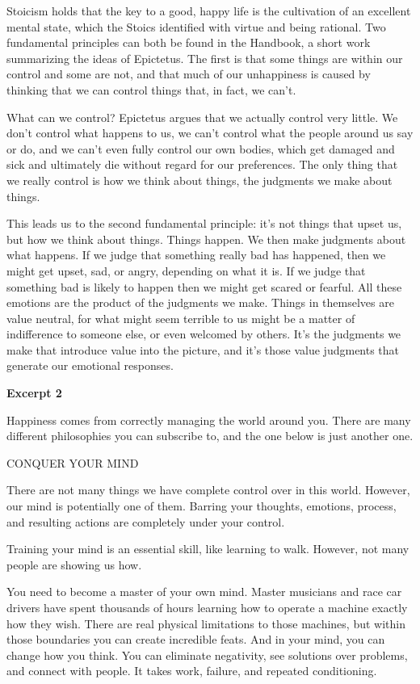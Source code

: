 \documentclass[UTF8,11pt]{ctexart}
\begin{document}
Stoicism holds that the key to a good, happy life is the cultivation of an excellent mental state, which the Stoics identified with virtue and being rational. Two fundamental principles can both be found in the Handbook, a short work summarizing the ideas of Epictetus. The first is that some things are within our control and some are not, and that much of our unhappiness is caused by thinking that we can control things that, in fact, we can’t.


What can we control? Epictetus argues that we actually control very little. We don’t control what happens to us, we can’t control what the people around us say or do, and we can’t even fully control our own bodies, which get damaged and sick and ultimately die without regard for our preferences. The only thing that we really control is how we think about things, the judgments we make about things.


This leads us to the second fundamental principle: it’s not things that upset us, but how we think about things. Things happen. We then make judgments about what happens. If we judge that something really bad has happened, then we might get upset, sad, or angry, depending on what it is. If we judge that something bad is likely to happen then we might get scared or fearful. All these emotions are the product of the judgments we make. Things in themselves are value neutral, for what might seem terrible to us might be a matter of indifference to someone else, or even welcomed by others. It’s the judgments we make that introduce value into the picture, and it’s those value judgments that generate our emotional responses.


\textbf{Excerpt 2}


Happiness comes from correctly managing the world around you. There are many different philosophies you can subscribe to, and the one below is just another one.


CONQUER YOUR MIND


There are not many things we have complete control over in this world. However, our mind is potentially one of them. Barring your thoughts, emotions, process, and resulting actions are completely under your control.


Training your mind is an essential skill, like learning to walk. However, not many people are showing us how.


You need to become a master of your own mind. Master musicians and race car drivers have spent thousands of hours learning how to operate a machine exactly how they wish. There are real physical limitations to those machines, but within those boundaries you can create incredible feats. And in your mind, you can change how you think. You can eliminate negativity, see solutions over problems, and connect with people. It takes work, failure, and repeated conditioning.
\end{document}
